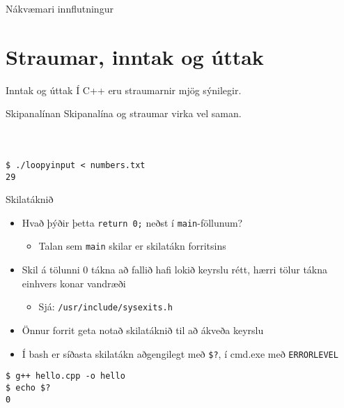 \documentclass[handout]{beamer}
\begin{document}
\begin{frame}{Nákvæmari innflutningur}
\end{frame}

\section{Straumar, inntak og úttak}

\begin{frame}{Inntak og úttak}
    Í C++ eru straumarnir mjög sýnilegir.
\end{frame}

\begin{frame}[fragile]{Skipanalínan}
Skipanalína og straumar virka vel saman.
\begin{columns}
    \inputminted[frame=lines,label=numbers.txt]{bash}{Code/w1/numbers.txt}
\end{columns}
\begin{verbatim}
$ ./loopyinput < numbers.txt
29
\end{verbatim}
\end{frame}

\begin{frame}[fragile]{Skilatáknið}
    \begin{itemize}
        \item Hvað þýðir þetta \texttt{return 0;} neðst í \texttt{main}-föllunum? \pause
        \begin{itemize}
            \item Talan sem \texttt{main} skilar er skilatákn  forritsins
        \end{itemize}
        \item Skil á tölunni 0 tákna að fallið hafi lokið keyrslu rétt, hærri tölur tákna einhvers konar vandræði
            \begin{itemize}
                \item Sjá: \texttt{/usr/include/sysexits.h}
            \end{itemize}
        \item Önnur forrit geta notað skilatáknið til að ákveða keyrslu
        \item Í bash er síðasta skilatákn aðgengilegt með \texttt{\$?}, í cmd.exe með \texttt{ERRORLEVEL}
    \end{itemize}
\begin{verbatim}
$ g++ hello.cpp -o hello
$ echo $?
0
\end{verbatim}
\end{frame}
\end{document}
